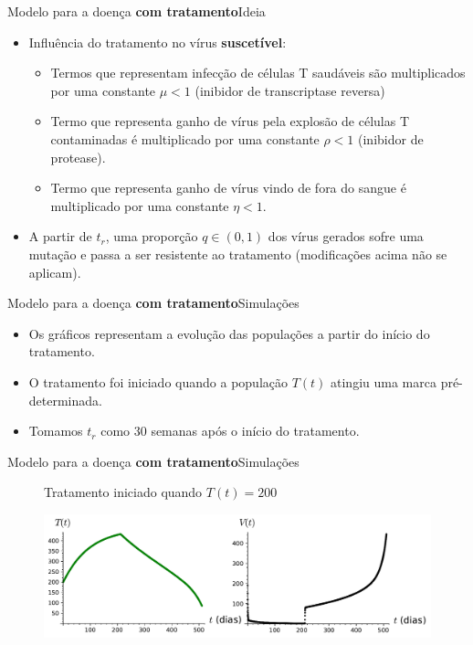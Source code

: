 \documentclass[13pt]{beamer}
\begin{document}
\begin{frame}{Modelo para a doença \textbf{com tratamento}}{Ideia}
    \begin{itemize}
        \item<1-> Influência do tratamento no vírus \textbf{suscetível}:
            \begin{itemize}
                \item<2-> Termos que representam infecção de células T saudáveis são multiplicados por uma constante \( \mu < 1 \) (inibidor de transcriptase reversa)
                \item<3-> Termo que representa ganho de vírus pela explosão de células T contaminadas é multiplicado por uma constante \( \rho < 1 \) (inibidor de protease).
                \item<4-> Termo que representa ganho de vírus vindo de fora do sangue é multiplicado por uma constante \( \eta < 1 \).
            \end{itemize}
        \item<5-> A partir de \( t_{ r } \), uma proporção \( q \in (0, 1) \) dos vírus gerados sofre uma mutação e passa a ser resistente ao tratamento (modificações acima não se aplicam).
    \end{itemize}
\end{frame}

\begin{frame}{Modelo para a doença \textbf{com tratamento}}{Simulações}
    \begin{itemize}
        \item<1-> Os gráficos representam a evolução das populações a partir do início do tratamento.
        \item<2-> O tratamento foi iniciado quando a população \( T ( t ) \) atingiu uma marca pré-determinada.
        \item<3-> Tomamos \( t_{ r } \) como \( 30 \) semanas após o início do tratamento.
    \end{itemize}
\end{frame}

\begin{frame}{Modelo para a doença \textbf{com tratamento}}{Simulações}
    \begin{figure}
        Tratamento iniciado quando \( T ( t ) = 200 \)
        \begin{center}
            \includegraphics[width=\textwidth]{../figuras/start_treatment_at_T_200.pdf}
        \end{center}
    \end{figure}
\end{frame}
\end{document}
